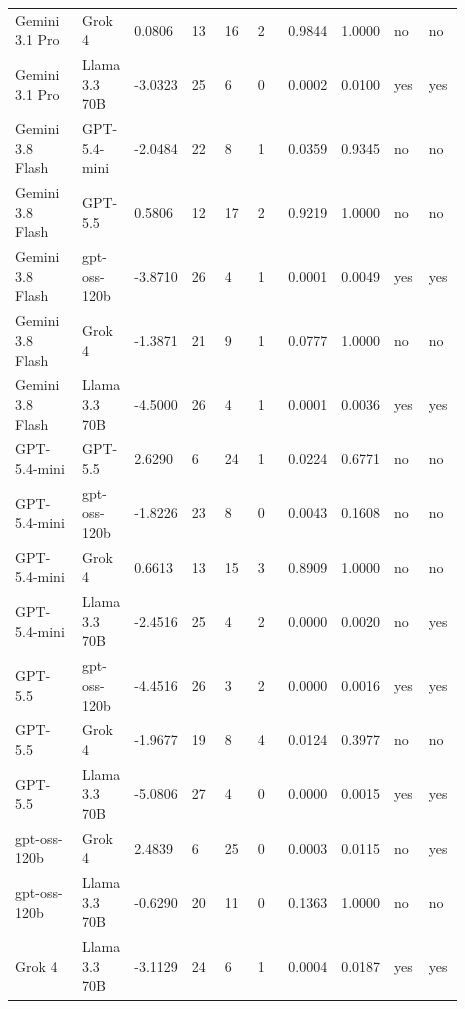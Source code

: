 \begin{landscape}
\begin{longtable}{p{0.162\linewidth}p{0.081\linewidth}p{0.081\linewidth}p{0.081\linewidth}p{0.081\linewidth}p{0.081\linewidth}p{0.081\linewidth}p{0.081\linewidth}p{0.081\linewidth}p{0.081\linewidth}}
Gemini 3.1 Pro & Grok 4 & 0.0806 & 13 & 16 & 2 & 0.9844 & 1.0000 & no & no \\
Gemini 3.1 Pro & Llama 3.3 70B & -3.0323 & 25 & 6 & 0 & 0.0002 & 0.0100 & yes & yes \\
Gemini 3.8 Flash & GPT-5.4-mini & -2.0484 & 22 & 8 & 1 & 0.0359 & 0.9345 & no & no \\
Gemini 3.8 Flash & GPT-5.5 & 0.5806 & 12 & 17 & 2 & 0.9219 & 1.0000 & no & no \\
Gemini 3.8 Flash & gpt-oss-120b & -3.8710 & 26 & 4 & 1 & 0.0001 & 0.0049 & yes & yes \\
Gemini 3.8 Flash & Grok 4 & -1.3871 & 21 & 9 & 1 & 0.0777 & 1.0000 & no & no \\
Gemini 3.8 Flash & Llama 3.3 70B & -4.5000 & 26 & 4 & 1 & 0.0001 & 0.0036 & yes & yes \\
GPT-5.4-mini & GPT-5.5 & 2.6290 & 6 & 24 & 1 & 0.0224 & 0.6771 & no & no \\
GPT-5.4-mini & gpt-oss-120b & -1.8226 & 23 & 8 & 0 & 0.0043 & 0.1608 & no & no \\
GPT-5.4-mini & Grok 4 & 0.6613 & 13 & 15 & 3 & 0.8909 & 1.0000 & no & no \\
GPT-5.4-mini & Llama 3.3 70B & -2.4516 & 25 & 4 & 2 & 0.0000 & 0.0020 & no & yes \\
GPT-5.5 & gpt-oss-120b & -4.4516 & 26 & 3 & 2 & 0.0000 & 0.0016 & yes & yes \\
GPT-5.5 & Grok 4 & -1.9677 & 19 & 8 & 4 & 0.0124 & 0.3977 & no & no \\
GPT-5.5 & Llama 3.3 70B & -5.0806 & 27 & 4 & 0 & 0.0000 & 0.0015 & yes & yes \\
gpt-oss-120b & Grok 4 & 2.4839 & 6 & 25 & 0 & 0.0003 & 0.0115 & no & yes \\
gpt-oss-120b & Llama 3.3 70B & -0.6290 & 20 & 11 & 0 & 0.1363 & 1.0000 & no & no \\
Grok 4 & Llama 3.3 70B & -3.1129 & 24 & 6 & 1 & 0.0004 & 0.0187 & yes & yes \\
\bottomrule
\end{longtable}
\normalsize
\end{landscape}
